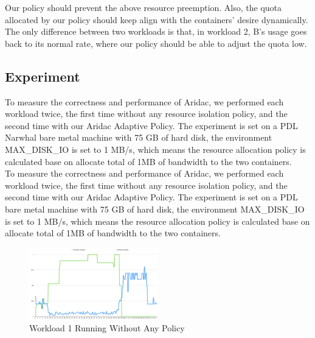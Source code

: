 \documentclass[10pt, conference,compsoc]{IEEEtran}
\begin{document}
Our policy should prevent the above resource preemption. Also, the quota allocated by our policy should keep align with the containers' desire dynamically. The only difference between two workloads is that, in workload 2, B's usage goes back to its normal rate, where our policy should be able to adjust the quota low. 

\subsection{Experiment}
To measure the correctness and performance of Aridac, we performed each workload twice, the first time without any resource isolation policy, and the second time with our Aridac Adaptive Policy. The experiment is set on a PDL Narwhal bare metal machine with 75 GB of hard disk, the environment {MAX\_DISK\_IO} is set to 1 MB/s, which means the resource allocation policy is calculated base on allocate total of 1MB of bandwidth to the two containers.\\

To measure the correctness and performance of Aridac, we performed each workload twice, the first time without any resource isolation policy, and the second time with our Aridac Adaptive Policy. The experiment is set on a PDL bare metal machine with 75 GB of hard disk, the environment MAX\_DISK\_IO is set to 1 MB/s, which means the resource allocation policy is calculated base on allocate total of 1MB of bandwidth to the two containers.\\

\begin{figure}[h]
\centering
\includegraphics[width=0.5\textwidth]{images/workload1_1.png}
\caption{Workload 1 Running Without Any Policy}
\end{figure}
\end{document}
